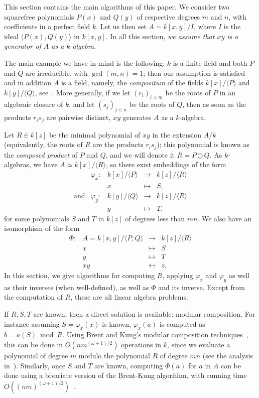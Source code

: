 \documentclass{sig-alternate}
\newcounter{algo}
\newcommand{\ang}[1]{\langle#1\rangle}
\begin{document}
This section contains the main algorithms of this paper. We consider
two squarefree polynomials $P(x)$ and $Q(y)$ of respective degrees $m$
and $n$, with coefficients in a perfect field $k$. Let us then set
$A=k[x,y]/I$, where $I$ is the ideal $\ang{P(x),Q(y)}$ in $k[x,y]$. In
all this section, {\em we assume that $xy$ is a generator of $A$ as a
  $k$-algebra}. 

The main example we have in mind is the following: $k$ is a finite
field and both $P$ and $Q$ are irreducible, with $\gcd(m,n)=1$; then
our assumption is satisfied and in addition $A$ is a field, namely,
the {\em compositum} of the fields $k[x]/\ang{P}$ and $k[y]/\ang{Q}$,
see~\cite{BrCa87}. More generally, if we let $(r_i)_{i<m}$ be the
roots of $P$ in an algebraic closure of $k$, and let $(s_j)_{j<n}$ be
the roots of $Q$, then as soon as the products $r_i s_j$ are pairwise
distinct, $xy$ generates $A$ as a $k$-algebra.

Let $R \in k[z]$ be the minimal polynomial of $xy$ in the extension
$A/k$ (equivalently, the roots of $R$ are the products $r_i s_j$);
this polynomial is known as the {\em composed product} of $P$ and $Q$,
and we will denote it $R = P \odot Q$. As $k$-algebras, we have $A
\simeq k[x]/\ang{R}$, so there exist embeddings of the form
$$
\begin{array}{ccccc}
&\varphi_x: & k[x]/\ang{P} & \to & k[z]/\ang{R}\\
& & x & \mapsto & S,\\[2mm]
\text{and} & \varphi_y: & k[y]/\langle Q \rangle & \to & k[z]/\ang{R}\\
& & y & \mapsto & T,
\end{array}
$$
for some polynomials $S$ and $T$ in $k[z]$ of degrees less
than $mn$. We also have an isomorphism of the form
$$\begin{array}{cccc} 
\Phi:&  A=k[x,y]/\langle P,Q\rangle & \to & k[z]/\ang{R} \\
&  x & \mapsto & S \\
&  y & \mapsto & T \\
&  xy & \mapsfrom & z.
\end{array}$$
In this section, we give algorithms for computing $R$, applying
$\varphi_x$ and $\varphi_y$ as well as their inverses (when
well-defined), as well as $\Phi$ and its inverse. Except from the
computation of $R$, these are all linear algebra problems.

If $R,S,T$ are known, then a direct solution is available: modular
composition. For instance assuming $S=\varphi_x(x)$ is known,
$\varphi_x(a)$ is computed as $b=a(S) \bmod R$. Using Brent and Kung's
modular composition techniques~\cite{brent+kung}, this can be done in
$O(n m^{(\omega+1)/2})$ operations in $k$, since we evaluate a
polynomial of degree $m$ modulo the polynomial $R$ of degree $mn$ (see
the analysis in~\cite{shoup94}). Similarly, once $S$ and $T$ are
known, computing $\Phi(a)$ for $a$ in $A$ can be done using a
bivariate version of the Brent-Kung algorithm, with running time
$O((nm)^{(\omega+1)/2})$~\cite{PoSc13b}.
\end{document}
